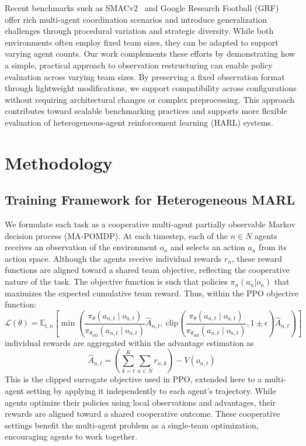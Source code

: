 \documentclass{article}
\begin{document}
Recent benchmarks such as SMACv2~\cite{ellis2023} and Google Research Football 
(GRF)~\cite{kurach2020} offer rich multi-agent coordination scenarios and introduce 
generalization challenges through procedural variation and strategic diversity. While both 
environments often employ fixed team sizes, they can be adapted to support varying agent counts.
Our work complements these efforts by demonstrating how a simple, practical approach to 
observation restructuring can enable policy evaluation across varying team sizes. By 
preserving a fixed observation format through lightweight modifications, we support compatibility 
across configurations without requiring architectural changes or complex preprocessing.
This approach contributes toward scalable benchmarking practices and supports 
more flexible evaluation of heterogeneous-agent reinforcement learning (HARL) systems.


\section{Methodology}\label{sec:methodology}

\subsection{Training Framework for Heterogeneous MARL}
\label{subsec:training_framework}

We formulate each task as a cooperative multi-agent partially observable Markov 
decision process (MA-POMDP). At each timestep, each of the $n\in N$ agents receives 
an observation of the environment $o_n$ and selects an action $a_n$ from its action space. 
Although the agents receive individual rewards $r_n$, these reward functions are aligned 
toward a shared team objective, reflecting the cooperative nature of the task.
The objective function is such that policies \(\pi_n(a_n|o_n)\)
that maximizes the expected cumulative team reward. Thus, within the PPO objective function:
\[
    \mathcal{L}(\theta) = \mathbb{E}_{t,n} \left[ 
    \min \left( 
    \frac{\pi_\theta(a_{n,t} \mid o_{n,t})}{\pi_{\theta_{\text{old}}}(a_{n,t} \mid o_{n,t})} \hat{A}_{n,t},\ 
    \text{clip}\left( 
    \frac{\pi_\theta(a_{n,t} \mid o_{n,t})}{\pi_{\theta_{\text{old}}}(a_{n,t} \mid o_{n,t})}, 
    1 \pm \epsilon
    \right) \hat{A}_{n,t}
    \right) 
    \right]
\]
individual rewards are aggregated within the advantage estimation as
\[
    \hat{A}_{n,t} = \left( \sum_{k=t}^{K} \sum_{n\in N} r_{n,k} \right) - V(o_{n,t})
\]
This is the clipped surrogate objective used in PPO, extended here to a multi-agent setting by 
applying it independently to each agent's trajectory. While agents optimize their policies using
local observations and advantages, their rewards are aligned toward a shared cooperative outcome.
These cooperative settings benefit the multi-agent problem as a single-team optimization, 
encouraging agents to work together. 
\end{document}
